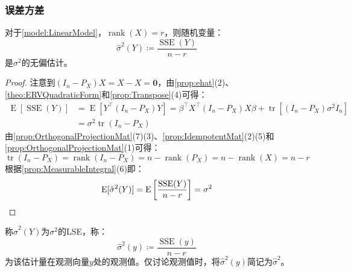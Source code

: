 \subsubsection{误差方差}
\begin{theorem}\label{theo:VarianceOfErrorTerm}
	对于\cref{model:LinearModel}，$\operatorname{rank}(X)=r$，则随机变量：
	\begin{equation*}
		\hat{\sigma}^2(Y)\coloneq\frac{\operatorname{SSE}(Y)}{n-r}
	\end{equation*}
	是$\sigma^2$的无偏估计。
\end{theorem}
\begin{proof}
	注意到$(I_n-P_X)X=X-X=\mathbf{0}$，由\cref{prop:ehat}(2)、\cref{theo:ERVQuadraticForm}和\cref{prop:Transpose}(4)可得：
	\begin{align*}
		\operatorname{E}[\operatorname{SSE}(Y)]&=\operatorname{E}[Y^{\top}(I_n-P_X)Y] =\beta^{\top}X^{\top}(I_n-P_X)X\beta+\operatorname{tr}[(I_n-P_X)\sigma^2I_n] \\
		&=\sigma^2\operatorname{tr}(I_n-P_X)
	\end{align*}
	由\cref{prop:OrthogonalProjectionMat}(7)(3)、\cref{prop:IdempotentMat}(2)(5)和\cref{prop:OrthogonalProjectionMat}(1)可得：
	\begin{equation*}
		\operatorname{tr}(I_n-P_X)=\operatorname{rank}(I_n-P_X)=n-\operatorname{rank}(P_X)=n-\operatorname{rank}(X)=n-r
	\end{equation*}
	根据\cref{prop:MeasurableIntegral}(6)即：
	\begin{equation*}
		\operatorname{E}[\hat{\sigma}^2(Y)]=\operatorname{E}\left[\frac{\operatorname{SSE}(Y)}{n-r}\right]=\sigma^2\qedhere
	\end{equation*}
\end{proof}
\begin{definition}
	称$\hat{\sigma}^2(Y)$为$\sigma^2$的LSE，称：
	\begin{equation*}
		\hat{\sigma}^2(y)\coloneq\frac{\operatorname{SSE}(y)}{n-r}
	\end{equation*}
	为该估计量在观测向量$y$处的观测值。仅讨论观测值时，将$\hat{\sigma}^2(y)$简记为$\hat{\sigma}^2$。
\end{definition}

